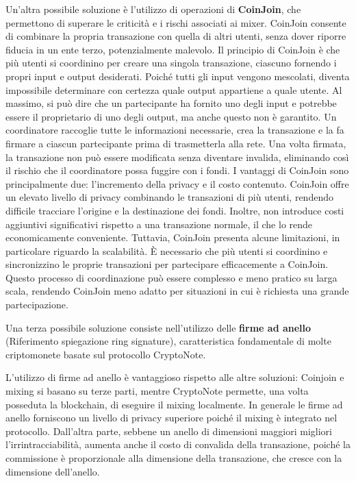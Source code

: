 Un'altra possibile soluzione è l'utilizzo di operazioni di \textbf{CoinJoin}, che permettono di superare le criticità e i rischi associati ai mixer. CoinJoin consente di combinare la propria transazione con quella di altri utenti, senza dover riporre fiducia in un ente terzo, potenzialmente malevolo. Il principio di CoinJoin è che più utenti si coordinino per creare una singola transazione, ciascuno fornendo i propri input e output desiderati. Poiché tutti gli input vengono mescolati, diventa impossibile determinare con certezza quale output appartiene a quale utente. Al massimo, si può dire che un partecipante ha fornito uno degli input e potrebbe essere il proprietario di uno degli output, ma anche questo non è garantito.
Un coordinatore raccoglie tutte le informazioni necessarie, crea la transazione e la fa firmare a ciascun partecipante prima di trasmetterla alla rete. Una volta firmata, la transazione non può essere modificata senza diventare invalida, eliminando così il rischio che il coordinatore possa fuggire con i fondi.
I vantaggi di CoinJoin sono principalmente due: l'incremento della privacy e il costo contenuto. CoinJoin offre un elevato livello di privacy combinando le transazioni di più utenti, rendendo difficile tracciare l'origine e la destinazione dei fondi. Inoltre, non introduce costi aggiuntivi significativi rispetto a una transazione normale, il che lo rende economicamente conveniente.
Tuttavia, CoinJoin presenta alcune limitazioni, in particolare riguardo la scalabilità. È necessario che più utenti si coordinino e sincronizzino le proprie transazioni per partecipare efficacemente a CoinJoin. Questo processo di coordinazione può essere complesso e meno pratico su larga scala, rendendo CoinJoin meno adatto per situazioni in cui è richiesta una grande partecipazione.

Una terza possibile soluzione consiste nell'utilizzo delle \textbf{firme ad anello} (Riferimento spiegazione ring signature), caratteristica fondamentale di molte criptomonete basate sul protocollo CryptoNote. 

L'utilizzo di firme ad anello è vantaggioso rispetto alle altre soluzioni: Coinjoin e mixing si basano su terze parti, mentre CryptoNote permette, una volta posseduta la blockchain, di eseguire il mixing localmente. In generale le firme ad anello forniscono un livello di privacy superiore poiché il mixing è integrato nel protocollo. Dall'altra parte, sebbene un anello di dimensioni maggiori migliori l'irrintracciabilità, aumenta anche il costo di convalida della transazione, poiché la commissione è proporzionale alla dimensione della transazione, che cresce con la dimensione dell'anello.

